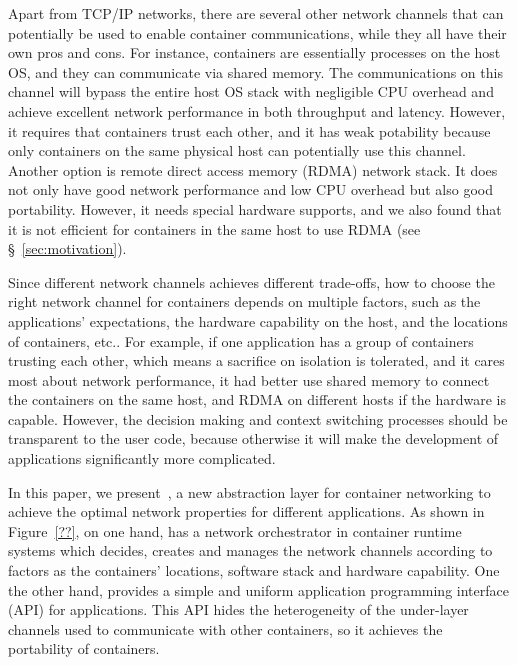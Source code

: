 Apart from TCP/IP networks, there are several other network channels that can potentially be used to enable 
container communications, while they all have their own pros and cons.
For instance, containers are essentially processes on the host OS, and they can communicate
via shared memory. The communications on this channel will bypass the entire host OS stack with negligible CPU overhead and achieve
excellent network performance in both throughput and latency. However, it requires that containers trust each other, 
and it has weak
potability because only containers on the same physical host can potentially use this channel. Another option is remote direct access memory (RDMA) network stack. It does not only have good network performance and low CPU overhead but also good portability. 
However, it needs special hardware supports, and we also found that it is not efficient for containers in the same host to use RDMA
(see \S~\ref{sec:motivation}). 

Since different network channels achieves different trade-offs, how to choose the right network channel for containers depends 
on multiple factors, such as the applications' expectations, 
the hardware capability on the host, and the locations of containers, etc.. For example, if one application has a group of containers trusting each other, which means a sacrifice on isolation is tolerated, and it cares most about network performance, it had better use
shared memory to connect the containers on the same host, and RDMA on different hosts if the hardware is capable. However, the decision making and context switching processes should be transparent to the user code, because otherwise it will make the development of applications significantly more complicated.

In this paper, we present~\sysname, a new abstraction layer for container networking to achieve the optimal network properties for different applications. 
As shown in Figure~\ref{??}, on one hand, \sysname has a network orchestrator in container runtime systems which decides, creates and manages the network channels according to factors as the containers' locations, software stack and hardware capability. One the other hand, \sysname provides a simple and uniform application programming interface (API) for applications. This API hides the heterogeneity of the under-layer channels used
to communicate with other containers, so it achieves the portability of containers.   

